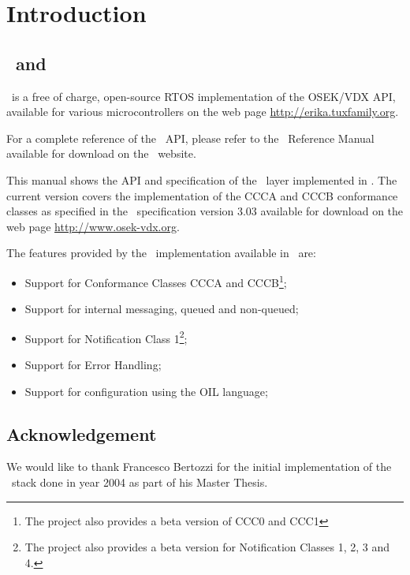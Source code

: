\chapter{Introduction}

\section{\ee\ and \oc}

\ee\ is a free of charge, open-source RTOS implementation of the
OSEK/VDX API, available for various microcontrollers on the web page
\url{http://erika.tuxfamily.org}.

For a complete reference of the \ee\ API, please refer to the
\ee\ Reference Manual available for download on the \ee\ website.

This manual shows the API and specification of the \oc\ layer
implemented in \ee. The current version covers the
implementation of the CCCA and CCCB conformance classes as specified
in the \oc\ specification version 3.03 available for download on
the web page \url{http://www.osek-vdx.org}.

The features provided by the \oc\ implementation available in \ee\ are:

\begin{itemize}
\item Support for Conformance Classes CCCA and CCCB\footnote{The project also provides a beta version of CCC0 and CCC1};
\item Support for internal messaging, queued and non-queued;
\item Support for Notification Class 1\footnote{The project also provides a beta version for Notification Classes 1, 2, 3 and 4.};
\item Support for Error Handling;
\item Support for configuration using the OIL language;
\end{itemize}


\section{Acknowledgement}
We would like to thank Francesco Bertozzi for the initial
implementation of the \oc\ stack done in year 2004 as part of his
Master Thesis.

